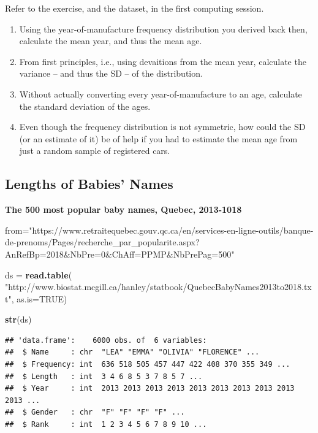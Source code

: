 \documentclass[]{book}
\newenvironment{Shaded}{\begin{snugshade}}{\end{snugshade}}
\newcommand{\DataTypeTok}[1]{\textcolor[rgb]{0.13,0.29,0.53}{#1}}
\newcommand{\KeywordTok}[1]{\textcolor[rgb]{0.13,0.29,0.53}{\textbf{#1}}}
\newcommand{\NormalTok}[1]{#1}
\newcommand{\OtherTok}[1]{\textcolor[rgb]{0.56,0.35,0.01}{#1}}
\newcommand{\StringTok}[1]{\textcolor[rgb]{0.31,0.60,0.02}{#1}}
\begin{document}
Refer to the exercise, and the dataset, in the first computing session.

\begin{enumerate}
\def\labelenumi{\arabic{enumi}.}
\item
  Using the year-of-manufacture frequency distribution you derived back then, calculate the mean year, and thus the mean age.
\item
  From first principles, i.e., using devaitions from the mean year, calculate the variance -- and thus the SD -- of the distribution.
\item
  Without actually converting every year-of-manufacture to an age, calculate the standard deviation of the ages.
\item
  Even though the frequency distribution is not symmetric, how could the SD (or an estimate of it) be of help if you had to estimate the mean age from just a random sample of registered cars.
\end{enumerate}

\hypertarget{lengths-of-babies-names}{%
\subsection{Lengths of Babies' Names}\label{lengths-of-babies-names}}

\textbf{The 500 most popular baby names, Quebec, 2013-1018}

\begin{Shaded}
\begin{Highlighting}[]
\NormalTok{from=}\StringTok{"https://www.retraitequebec.gouv.qc.ca/en/services-en-ligne-outils/banque-de-prenoms/Pages/recherche_par_popularite.aspx?AnRefBp=2018&NbPre=0&ChAff=PPMP&NbPrePag=500"}

\NormalTok{ds =}\StringTok{ }\KeywordTok{read.table}\NormalTok{(}
\StringTok{"http://www.biostat.mcgill.ca/hanley/statbook/QuebecBabyNames2013to2018.txt"}\NormalTok{,}
\DataTypeTok{as.is=}\OtherTok{TRUE}\NormalTok{)}

\KeywordTok{str}\NormalTok{(ds)}
\end{Highlighting}
\end{Shaded}

\begin{verbatim}
## 'data.frame':    6000 obs. of  6 variables:
##  $ Name     : chr  "LEA" "EMMA" "OLIVIA" "FLORENCE" ...
##  $ Frequency: int  636 518 505 457 447 422 408 370 355 349 ...
##  $ Length   : int  3 4 6 8 5 3 7 8 5 7 ...
##  $ Year     : int  2013 2013 2013 2013 2013 2013 2013 2013 2013 2013 ...
##  $ Gender   : chr  "F" "F" "F" "F" ...
##  $ Rank     : int  1 2 3 4 5 6 7 8 9 10 ...
\end{verbatim}
\end{document}
